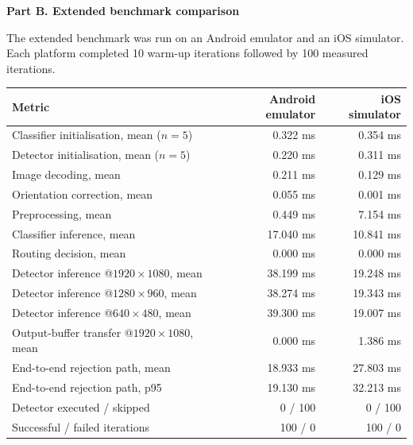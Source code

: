 \documentclass[preprint,12pt,authoryear]{elsarticle}
\begin{document}
\medskip

\noindent\textbf{Part B. Extended benchmark comparison}

The extended benchmark was run on an Android emulator and an iOS simulator.
Each platform completed 10 warm-up iterations followed by 100 measured
iterations.

\begin{center}
\footnotesize
\setlength{\tabcolsep}{4pt}
\begin{tabular}{p{168pt} r r}
\toprule
Metric & Android emulator & iOS simulator \\
\midrule
Classifier initialisation, mean ($n=5$)       & 0.322 ms & 0.354 ms \\
Detector initialisation, mean ($n=5$)         & 0.220 ms & 0.311 ms \\
Image decoding, mean                          & 0.211 ms & 0.129 ms \\
Orientation correction, mean                  & 0.055 ms & 0.001 ms \\
Preprocessing, mean                           & 0.449 ms & 7.154 ms \\
Classifier inference, mean                    & 17.040 ms & 10.841 ms \\
Routing decision, mean                        & 0.000 ms & 0.000 ms \\
Detector inference @$1920\times1080$, mean    & 38.199 ms & 19.248 ms \\
Detector inference @$1280\times960$, mean     & 38.274 ms & 19.343 ms \\
Detector inference @$640\times480$, mean      & 39.300 ms & 19.007 ms \\
Output-buffer transfer @$1920\times1080$, mean & 0.000 ms & 1.386 ms \\
End-to-end rejection path, mean               & 18.933 ms & 27.803 ms \\
End-to-end rejection path, p95                & 19.130 ms & 32.213 ms \\
Detector executed / skipped                   & 0 / 100 & 0 / 100 \\
Successful / failed iterations                & 100 / 0 & 100 / 0 \\
\bottomrule
\end{tabular}
\end{center}
\end{document}
